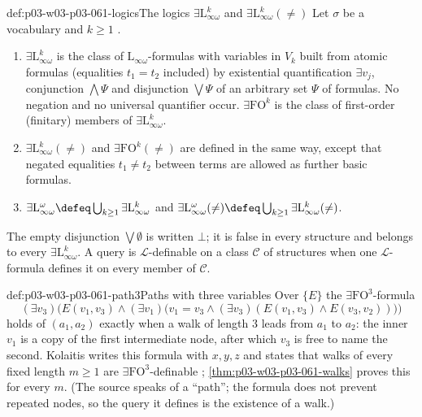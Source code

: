 \begin{hbdefinition}{def:p03-w03-p03-061-logics}{The logics \(\exists\mathrm L^k_{\infty\omega}\) and \(\exists\mathrm L^k_{\infty\omega}(\neq)\)}
Let \(\sigma\) be a vocabulary and \(k\ge1\)
\cite[Def.~8.1, p.~69]{Kolaitis2003ExpressivePowerNotes}.
\begin{enumerate}
\item \(\exists\mathrm L^k_{\infty\omega}\) is the class of
      \(\mathrm L_{\infty\omega}\)-formulas with variables in \(V_k\) built
      from atomic formulas (equalities \(t_1=t_2\) included) by existential
      quantification \(\exists v_j\), conjunction \(\bigwedge\Psi\) and
      disjunction \(\bigvee\Psi\) of an arbitrary set \(\Psi\) of formulas.
      No negation and no universal quantifier occur. \(\exists\mathrm{FO}^k\)
      is the class of first-order (finitary) members of
      \(\exists\mathrm L^k_{\infty\omega}\).
\item \(\exists\mathrm L^k_{\infty\omega}(\neq)\) and
      \(\exists\mathrm{FO}^k(\neq)\) are defined in the same way, except
      that negated equalities \(t_1\neq t_2\) between terms are allowed as
      further basic formulas.
\item \(\exists\mathrm L^\omega_{\infty\omega}\defeq\bigcup_{k\ge1}
      \exists\mathrm L^k_{\infty\omega}\) and
      \(\exists\mathrm L^\omega_{\infty\omega}(\neq)\defeq\bigcup_{k\ge1}
      \exists\mathrm L^k_{\infty\omega}(\neq)\).
\end{enumerate}
The empty disjunction \(\bigvee\emptyset\) is written \(\bot\); it is false
in every structure and belongs to every \(\exists\mathrm L^k_{\infty\omega}\).
A query is \(\mathcal L\)-definable on a class \(\mathcal C\) of structures
when one \(\mathcal L\)-formula defines it on every member of \(\mathcal C\).
\end{hbdefinition}

\begin{hbexample}{def:p03-w03-p03-061-path3}{Paths with three variables}
Over \(\{E\}\) the \(\exists\mathrm{FO}^3\)-formula
\[
 (\exists v_3)\bigl(E(v_1,v_3)\wedge(\exists v_1)\bigl(v_1=v_3\wedge
 (\exists v_3)(E(v_1,v_3)\wedge E(v_3,v_2))\bigr)\bigr)
\]
holds of \((a_1,a_2)\) exactly when a walk of length \(3\) leads from
\(a_1\) to \(a_2\): the inner \(v_1\) is a copy of the first intermediate
node, after which \(v_3\) is free to name the second. Kolaitis writes this
formula with \(x,y,z\) and states that walks of every fixed length \(m\ge1\)
are \(\exists\mathrm{FO}^3\)-definable \cite[p.~70]{Kolaitis2003ExpressivePowerNotes};
\cref{thm:p03-w03-p03-061-walks} proves this for every \(m\). (The source
speaks of a ``path''; the formula does not prevent repeated nodes, so the
query it defines is the existence of a walk.)
\end{hbexample}


